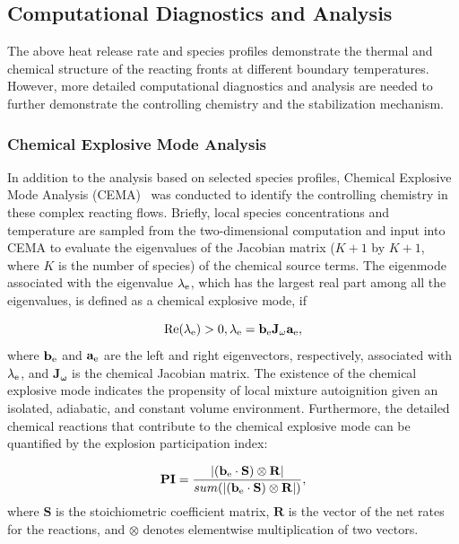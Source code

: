\subsection{Computational Diagnostics and Analysis} \label{sec:diagnostics}

The above heat release rate and species profiles demonstrate the thermal and chemical structure of the reacting fronts at different boundary temperatures.  However, more detailed computational diagnostics and analysis are needed to further demonstrate the controlling chemistry and the stabilization mechanism.

\subsubsection{Chemical Explosive Mode Analysis}
In addition to the analysis based on selected species profiles, Chemical Explosive Mode Analysis (CEMA)~\cite{lu10,shan12} was conducted to identify the controlling chemistry in these complex reacting flows.  Briefly, local species concentrations and temperature are sampled from the two-dimensional computation and input into CEMA to evaluate the eigenvalues of the Jacobian matrix ($K + 1$ by $K + 1$, where $K$ is the number of species) of the chemical source terms.  The eigenmode associated with the eigenvalue $\lambda_{\rm e}$, which has the largest real part among all the eigenvalues, is defined as a chemical explosive mode, if

\begin{equation}
\rm{Re}(\lambda_{\rm e}) > 0, \lambda_{\rm e} = \mathbf{b_{\rm e}J_{\omega}a_{\rm e}},
\end{equation}
where $\mathbf{b_{\rm e}}$ and $\mathbf{a_{\rm e}}$ are the left and right eigenvectors, respectively, associated with $\lambda_{\rm e}$, and $\mathbf{J_{\omega}}$ is the chemical Jacobian matrix.  The existence of the chemical explosive mode indicates the propensity of local mixture autoignition given an isolated, adiabatic, and constant volume environment.  Furthermore, the detailed chemical reactions that contribute to the chemical explosive mode can be quantified by the explosion participation index:

\begin{equation}
\mathbf{PI} = \frac{|(\mathbf{b_{\rm e}} \cdot \mathbf{S}) \otimes \mathbf{R}|}{sum(|(\mathbf{b_{\rm e}} \cdot \mathbf{S}) \otimes \mathbf{R}|)},
\end{equation}
where $\mathbf{S}$ is the stoichiometric coefficient matrix, $\mathbf{R}$ is the vector of the net rates for the reactions, and $\otimes$ denotes elementwise multiplication of two vectors.  

